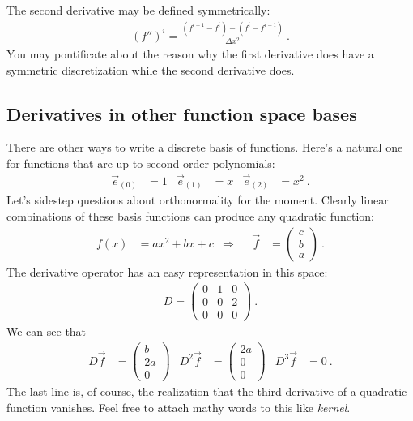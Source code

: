 The second derivative may be defined symmetrically:
\begin{align}
  (f'')^i = \frac{(f^{i+1} - f^i) - (f^i - f^{i-1})}{\Delta x^2} \ .
\end{align}
You may pontificate about the reason why the first derivative does have a symmetric discretization while the second derivative does. 


\subsection{Derivatives in other function space bases}
\label{sec:derivatives}

There are other ways to write a discrete basis of functions. Here’s a natural one for functions that are up to second-order polynomials:
\begin{align}
  \vec{e}_{(0)} &= 1
  &
  \vec{e}_{(1)} &= x
  &
  \vec{e}_{(2)} &= x^2 \ .
\end{align}
Let’s sidestep questions about orthonormality for the moment. Clearly linear combinations of these basis functions can produce any quadratic function:
\begin{align}
  f(x) &= a x^2 + bx + c
  & \Rightarrow&&
  \vec{f} &=
  \begin{pmatrix}
     c \\ b \\ a
   \end{pmatrix} \ . 
\end{align}
The derivative operator has an easy representation in this space:
\begin{align}
  D = 
  \begin{pmatrix}
    0 & 1 & 0   \\
    0 & 0 & 2   \\
    0 & 0 & 0   
  \end{pmatrix} \ .
\end{align}
We can see that
\begin{align}
  D \vec{f}  &= 
  \begin{pmatrix}
     b \\
     2 a \\
     0
  \end{pmatrix} 
  &
  D^2 \vec{f}  &= 
  \begin{pmatrix}
     2a \\
     0 \\
     0
  \end{pmatrix} 
  &
  D^3 \vec{f}  &= 
  0 \ .
\end{align}
The last line is, of course, the realization that the third-derivative of a quadratic function vanishes. Feel free to attach mathy words to this like \emph{kernel}.

